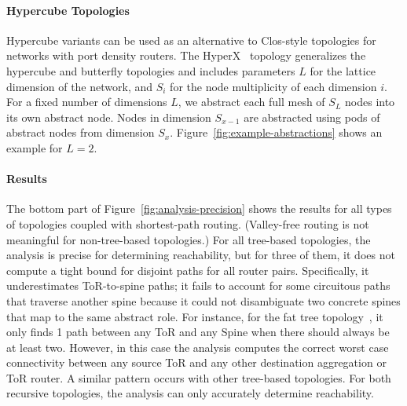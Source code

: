 \documentclass[numbers, 10pt]{sigplanconf}
\newcommand{\sysname}{{\text{}\small \sf Propane/AT}\xspace}
\newcommand{\para}[1]{\paragraph*{\textbf{#1}}}
\begin{document}
\para{Hypercube Topologies}
Hypercube variants can be used as an alternative to Clos-style topologies for networks with port density routers. The HyperX~\cite{hyperx} topology generalizes the hypercube and butterfly topologies and includes parameters $L$ for the lattice dimension of the network, and $S_i$ for the node multiplicity of each dimension $i$.
For a fixed number of dimensions $L$, we abstract each full mesh of $S_L$ nodes into its own abstract node. Nodes in dimension $S_{x-1}$ are abstracted using pods of abstract nodes from dimension $S_x$. Figure~\ref{fig:example-abstractions} shows an example for $L=2$.

\para{Results}
The bottom part of Figure~\ref{fig:analysis-precision} shows the results for all types of topologies coupled with shortest-path routing. (Valley-free routing is not meaningful for non-tree-based topologies.) For all tree-based topologies, the analysis is precise for determining reachability, but for three of them, it does not compute a tight bound for disjoint paths for all router pairs. Specifically, it underestimates ToR-to-spine paths; it fails to account for some circuitous paths that traverse another spine because it could not disambiguate two concrete spines that map to the same abstract role.
%
For instance, for the fat tree topology~\cite{fattree}, it only finds 1 path between any ToR and any Spine when there should always be at least two. However, in this case the analysis computes the correct worst case connectivity between any source ToR and any other destination aggregation or ToR router. A similar pattern occurs with other tree-based topologies.
%
For both recursive topologies, the analysis can only accurately determine reachability.


%
\end{document}
